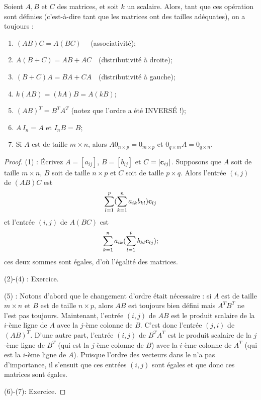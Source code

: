 \begin{theorem}
Soient $A,B$ et $C$ des matrices, et soit $k$ un scalaire.  Alors, tant que ces op\'eration sont d\'efinies (c'est-à-dire tant que les matrices ont des tailles adéquates), on a toujours :
\begin{enumerate}
\item $(AB)C = A(BC) \quad$ (associativit\'e);
\item $A(B+C) = AB + AC \quad$(distributivit\'e \`a droite);
\item $(B+C)A = BA + CA \quad$(distributivit\'e \`a gauche);
\item $k(AB) = (kA)B = A(kB)$;
\item $(AB)^T = B^TA^T$  (notez que l'ordre a \'et\'e INVERS\'E !);
\item $A\,I_n = A$ et $I_nB = B$;
\item Si $A$ est de taille $m\times n$, alors $A0_{n\times p} = 0_{m\times p}$ et
$0_{q\times m}A = 0_{q\times n}$.  
\end{enumerate}
\end{theorem}

\begin{proof}
(1) : Écrivez $A = [a_{ij}]$, $B = [b_{ij}]$ et $C = [\mathbf{c}_{ij}]$.  Supposons que
$A$ soit de taille $m\times n$, $B$ soit de taille $n \times p$ et $C$ soit de taille $p \times q$.
Alors l'entrée $(i,j)$ de $(AB)C$ est
$$
\sum_{l=1}^p(\sum_{k=1}^n a_{ik}b_{kl})\mathbf{c}_{lj}
$$
et l'entrée $(i,j)$ de $A(BC)$ est
$$
\sum_{k=1}^n a_{ik}(\sum_{l=1}^pb_{kl}\mathbf{c}_{lj});
$$ 
ces deux sommes sont égales, d'où l'égalité des matrices. 

(2)-(4) : Exercice.

(5) : Notons d'abord que le changement d'ordre était nécessaire : si $A$ est de taille $m\times n$ et $B$ est de taille $n\times p$, alors $AB$ est toujours bien défini mais $A^TB^T$ ne l'est pas toujours.
Maintenant, l'entrée $(i,j)$ de $AB$ est le produit scalaire de la $i$-ème ligne de $A$ 
avec la $j$-ème colonne de $B$. C'est donc l'entrée $(j,i)$ de $(AB)^T$.
D'une autre part, l'entrée $(i,j)$ de $B^TA^T$ est le produit scalaire de la $j$-ème ligne de
$B^T$ (qui est la $j$-ème colonne de $B$) avec la $i$-ème colonne de $A^T$ 
(qui est la $i$-ème ligne de $A$).  Puisque l'ordre des vecteurs dans le 
 n'a pas d'importance, il s'ensuit que ces entrées $(i,j)$ sont égales et que donc ces matrices sont égales.

(6)-(7):  Exercice.
\end{proof}

